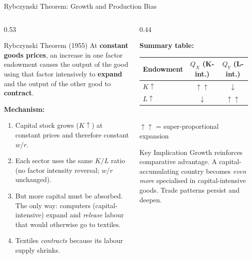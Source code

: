 \documentclass[aspectratio=169]{beamer}
\begin{document}

\begin{frame}[shrink=12]{Rybczynski Theorem: Growth and Production Bias}
\begin{columns}[T]
\begin{column}{0.53\textwidth}
\begin{block}{Rybczynski Theorem (1955)}
At \textbf{constant goods prices}, an increase in one
factor endowment causes the output of the good using
that factor intensively to \textbf{expand} and the
output of the other good to \textbf{contract}.
\end{block}
\vspace{0.3em}
\textbf{Mechanism:}
\begin{enumerate}\small
  \item Capital stock grows ($K\uparrow$) at constant
        prices and therefore constant $w/r$.
  \item Each sector uses the same $K/L$ ratio (no
        factor intensity reversal; $w/r$ unchanged).
  \item But more capital must be absorbed. The only
        way: computers (capital-intensive) expand and
        \emph{release} labour that would otherwise
        go to textiles.
  \item Textiles \emph{contracts} because its labour
        supply shrinks.
\end{enumerate}
\end{column}
\begin{column}{0.44\textwidth}
\begin{varbox}
\small\textbf{Summary table:}\\[0.3em]
\begin{tabular}{lcc}
\toprule
\textbf{Endowment} & $Q_X$ (K-int.) & $Q_Y$ (L-int.)\\
\midrule
$K\uparrow$ & $\uparrow\uparrow$ & $\downarrow$\\
$L\uparrow$ & $\downarrow$ & $\uparrow\uparrow$\\
\bottomrule
\end{tabular}\\[0.4em]
$\uparrow\uparrow$ = super-proportional expansion
\end{varbox}
\vspace{0.4em}
\begin{insight}{Key Implication}
\small Growth reinforces comparative advantage.
A capital-accumulating country becomes
\emph{even more} specialised in capital-intensive
goods. Trade patterns persist and deepen.
\end{insight}
\end{column}
\end{columns}
\end{frame}
\end{document}
